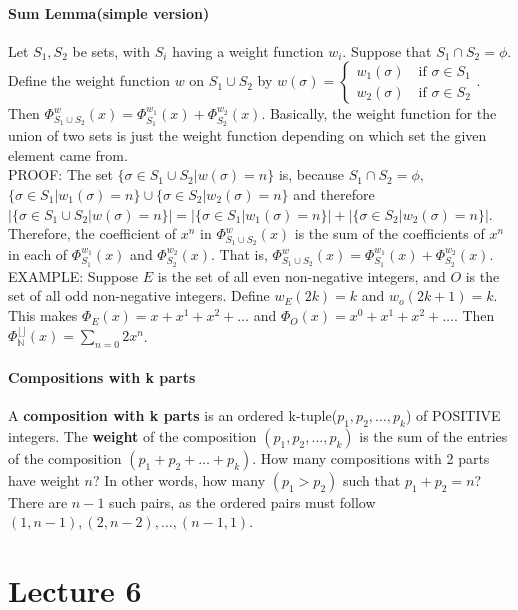 \documentclass[10pt,letter]{article}
\begin{document}
\paragraph{Sum Lemma(simple version)} Let $S_1,S_2$ be sets, with $S_i$ having a weight function $w_i$. Suppose that $S_1\cap S_2=\phi$. Define the weight function $w$ on $S_1\cup S_2$ by $w(\sigma)=\begin{cases}w_1(\sigma)\quad\text{if }\sigma\in S_1\\w_2(\sigma)\quad \text{if }\sigma\in S_2\end{cases}$. Then $\Phi_{S_1\cup S_2}^w(x)=\Phi_{S_1}^{w_1}(x)+\Phi_{S_2}^{w_2}(x)$. Basically, the weight function for the union of two sets is just the weight function depending on which set the given element came from.\\ 
PROOF: The set $\{\sigma\in S_1\cup S_2|w(\sigma)=n\}$ is, because $S_1\cap S_2=\phi$, $\{\sigma\in S_1|w_1(\sigma)=n\}\cup\{\sigma\in S_2|w_2(\sigma)=n\}$ and therefore $|\{\sigma\in S_1\cup S_2|w(\sigma)=n\}|=|\{\sigma\in S_1|w_1(\sigma)=n\}|+|\{\sigma\in S_2|w_2(\sigma)=n\}|$. Therefore, the coefficient of $x^n$ in $\Phi_{S_1\cup S_2}^w(x)$ is the sum of the coefficients of $x^n$ in each of $\Phi_{S_1}^{w_1}(x)$ and $\Phi_{S_2}^{w_2}(x)$. That is, $\Phi_{S_1\cup S_2}^w(x)=\Phi_{S_1}^{w_1}(x)+\Phi_{S_2}^{w_2}(x)$. \\ 
EXAMPLE: Suppose $E$ is the set of all even non-negative integers, and $O$ is the set of all odd non-negative integers. Define $w_E(2k)=k$ and $w_o(2k+1)=k$. This makes $\Phi_E(x)=x+x^1+x^2+\ldots$ and  $\Phi_O(x)=x^0+x^1+x^2+\ldots$. Then $\Phi_\mathbb{N}^{\lfloor\rfloor}(x)=\sum_{n=0}2x^n$. 

\paragraph{Compositions with k parts} 
A \textbf{composition with k parts} is an ordered k-tuple($p_1,p_2,\ldots,p_k$) of POSITIVE integers. The \textbf{weight} of the composition $(p_1,p_2,\ldots,p_k)$ is the sum of the entries of the composition $(p_1+p_2+\ldots+p_k)$. How many compositions with 2 parts have weight $n$? In other words, how many $(p_1>p_2)$ such that $p_1+p_2=n$? There are $n-1$ such pairs, as the ordered pairs must follow $(1,n-1), (2,n-2),\ldots,(n-1,1)$. 

\section*{Lecture 6}
\end{document}

